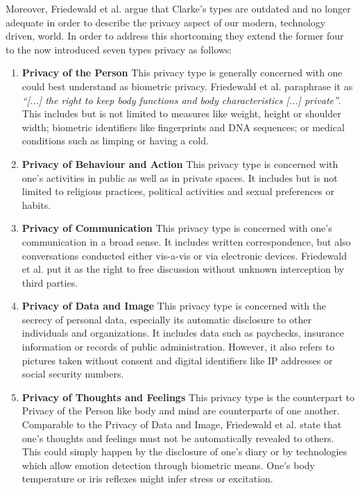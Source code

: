 \documentclass[runningheads,a4paper]{llncs}
\newcommand{\om}{[...]\xspace} %
\begin{document}
Moreover, Friedewald et al. argue that Clarke's types are outdated and no longer adequate in order to describe the privacy aspect of our modern, technology driven, world.
In order to address this shortcoming they extend the former four to the now introduced seven types privacy as follows:

\begin{enumerate}

\item \textbf{Privacy of the Person}
This privacy type is generally concerned with one could best understand as biometric privacy.
Friedewald et al. paraphrase it as \emph{``\om the right to keep body functions and body characteristics \om private''}.
This includes but is not limited to measures like weight, height or shoulder width;
biometric identifiers like fingerprints and DNA sequences;
or medical conditions such as limping or having a cold.


\item \textbf{Privacy of Behaviour and Action}
This privacy type is concerned with one's activities in public as well as in private spaces.
It includes but is not limited to religious practices, political activities and sexual preferences or habits.


\item \textbf{Privacy of Communication}
This privacy type is concerned with one's communication in a broad sense.
It includes written correspondence, but also conversations conducted either vis-a-vis or via electronic devices.
Friedewald et al. put it as the right to free discussion without unknown interception by third parties.


\item \textbf{Privacy of Data and Image}
This privacy type is concerned with the secrecy of personal data, especially its automatic disclosure to other individuals and organizations.
It includes data such as paychecks, insurance information or records of public administration.
However, it also refers to pictures taken without consent and digital identifiers like IP addresses or social security numbers.


\item \textbf{Privacy of Thoughts and Feelings}
This privacy type is the counterpart to Privacy of the Person like body and mind are counterparts of one another.
Comparable to the Privacy of Data and Image, Friedewald et al. state that one's thoughts and feelings must not be automatically revealed to others.
This could simply happen by the disclosure of one's diary or by technologies which allow emotion detection through biometric means.
One's body temperature or iris reflexes might infer stress or excitation.



\end{enumerate}
\end{document}
